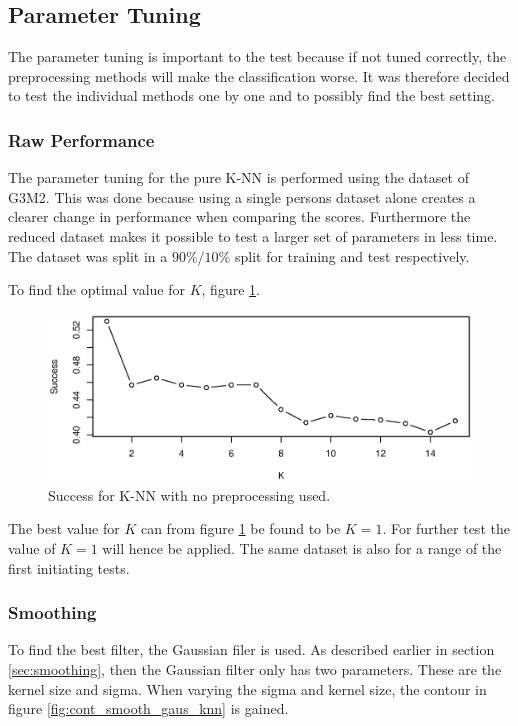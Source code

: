 \subsection{Parameter Tuning}
The parameter tuning is important to the test because if not tuned correctly, the preprocessing methods will make the classification worse.
It was therefore decided to test the individual methods one by one and to possibly find the best setting.

\subsubsection{Raw Performance}
The parameter tuning for the pure K-NN is performed using the dataset of G3M2.
This was done because using a single persons dataset alone creates a clearer change in performance when comparing the scores.
Furthermore the reduced dataset makes it possible to test a larger set of parameters in less time.
The dataset was split in a $90\%/10\%$ split for training and test respectively.

To find the optimal value for $K$, figure \ref{fig:k_success}.

\begin{figure}[H]
\centering
\includegraphics[width = 0.9 \textwidth]{graphics/knn_raw_success}
\caption{Success for K-NN with no preprocessing used.}
\label{fig:k_success}
\end{figure}

The best value for $K$ can from figure \ref{fig:k_success} be found to be $K = 1$.
For further test the value of $K = 1$ will hence be applied.
The same dataset is also for a range of the first initiating tests.


\subsubsection{Smoothing}
\label{sec:knn_smooth}
To find the best filter, the Gaussian filer is used.
As described earlier in section \ref{sec:smoothing}, then the Gaussian filter only has two parameters.
These are the kernel size and sigma.
When varying the sigma and kernel size, the contour in figure \ref{fig:cont_smooth_gaus_knn} is gained.

